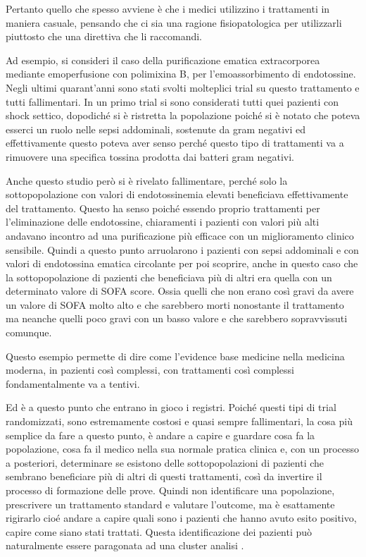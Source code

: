 Pertanto quello che spesso avviene è che i medici utilizzino i trattamenti in maniera casuale, pensando che ci sia una ragione fisiopatologica per utilizzarli piuttosto che una direttiva che li raccomandi.

Ad esempio, si consideri il caso della purificazione ematica extracorporea mediante emoperfusione con polimixina B, per l'emoassorbimento di endotossine.
Negli ultimi quarant'anni sono stati svolti molteplici trial su questo trattamento e tutti fallimentari. In un primo trial si sono considerati tutti quei pazienti con shock settico, dopodiché si è ristretta la popolazione poiché si è notato che poteva esserci un ruolo nelle sepsi addominali, sostenute da gram negativi ed effettivamente questo poteva aver senso perché questo tipo di trattamenti va a rimuovere una specifica tossina prodotta dai batteri gram negativi.

Anche questo studio però si è rivelato fallimentare, perché solo la sottopopolazione con valori di endotossinemia elevati beneficiava effettivamente del trattamento. Questo ha senso poiché essendo proprio trattamenti per l'eliminazione delle endotossine, chiaramenti i pazienti con valori più alti andavano incontro ad una purificazione più efficace con un miglioramento clinico sensibile. 
Quindi a questo punto arruolarono i pazienti con sepsi addominali e con valori di endotossina ematica circolante per poi scoprire, anche in questo caso che la sottopopolazione di pazienti che beneficiava più di altri era quella con un determinato valore di SOFA score. 
Ossia quelli che non erano così gravi da avere un valore di SOFA molto alto e che sarebbero morti nonostante il trattamento ma neanche quelli poco gravi con un basso valore e che sarebbero sopravvissuti comunque.

Questo esempio permette di dire come l'evidence base medicine nella medicina moderna, in pazienti così complessi, con trattamenti così complessi fondamentalmente va a tentivi. 

Ed è a questo punto che entrano in gioco i registri. 
Poiché questi tipi di trial randomizzati, sono estremamente costosi e quasi sempre fallimentari, la cosa più semplice da fare a questo punto, è andare a capire e guardare cosa fa la popolazione, cosa fa il medico nella sua normale pratica clinica e, con un processo a posteriori, determinare se esistono delle sottopopolazioni di pazienti che sembrano beneficiare più di altri di questi trattamenti, così da invertire il processo di formazione delle prove. 
Quindi non identificare una popolazione, prescrivere un trattamento standard e valutare l'outcome, ma è esattamente rigirarlo cioé andare a capire quali sono i pazienti che hanno avuto esito positivo, capire come siano stati trattati. Questa identificazione dei pazienti può naturalmente essere paragonata ad una cluster analisi \cite{villa2019oxirisnet}. 

